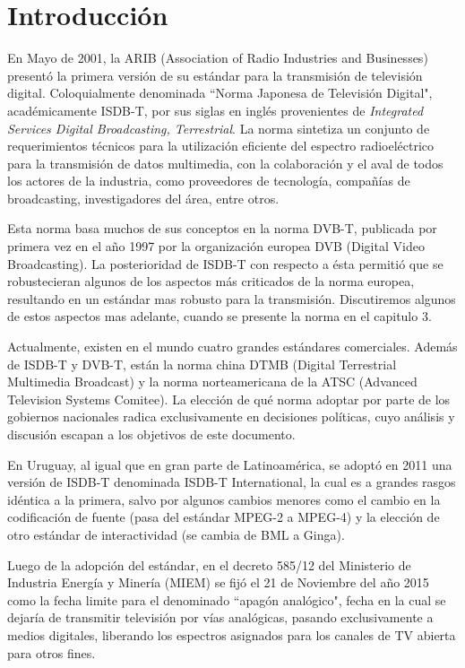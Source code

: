 \chapter{Introducción}

En Mayo de 2001, la ARIB (Association of Radio Industries and Businesses)\cite{ARIB} presentó la primera versión de su estándar para la transmisión de televisión digital\cite{norma}. Coloquialmente denominada ``Norma Japonesa de Televisión Digital", académicamente ISDB-T, por sus siglas en inglés provenientes de \textit{Integrated Services Digital Broadcasting, Terrestrial}. La norma sintetiza un conjunto de requerimientos técnicos para la utilización eficiente del espectro radioeléctrico para la transmisión de datos multimedia, con la colaboración y el aval de todos los actores de la industria, como proveedores de tecnología, compañías de broadcasting, investigadores del área, entre otros.

Esta norma basa muchos de sus conceptos en la norma DVB-T, publicada por primera vez en el año 1997 por la organización europea DVB (Digital Video Broadcasting). La posterioridad de ISDB-T con respecto a ésta permitió que se robustecieran algunos de los aspectos más criticados de la norma europea, resultando en un estándar mas robusto para la transmisión. Discutiremos algunos de estos aspectos mas adelante, cuando se presente la norma en el capitulo 3.

Actualmente, existen en el mundo cuatro grandes estándares comerciales. Además de ISDB-T y DVB-T, están la norma china DTMB (Digital Terrestrial Multimedia Broadcast) y la norma norteamericana de la ATSC (Advanced Television Systems Comitee). La elección de qué norma adoptar por parte de los gobiernos nacionales radica exclusivamente en decisiones políticas, cuyo análisis y discusión escapan a los objetivos de este documento.

En Uruguay, al igual que en gran parte de Latinoamérica, se adoptó en 2011 una versión de ISDB-T denominada ISDB-T International, la cual es a grandes rasgos idéntica a la primera, salvo por algunos cambios menores como el cambio en la codificación de fuente (pasa del estándar MPEG-2 a MPEG-4) y la elección de otro estándar de interactividad (se cambia de BML a Ginga).

Luego de la adopción del estándar, en el decreto 585/12 del Ministerio de Industria Energía y Minería (MIEM) se fijó el 21 de Noviembre del año 2015 como la fecha limite para el denominado ``apagón analógico"\cite{decreto_apagon}, fecha en la cual se dejaría de transmitir televisión por vías analógicas, pasando exclusivamente a medios digitales, liberando los espectros asignados para los canales de TV abierta para otros fines. 

